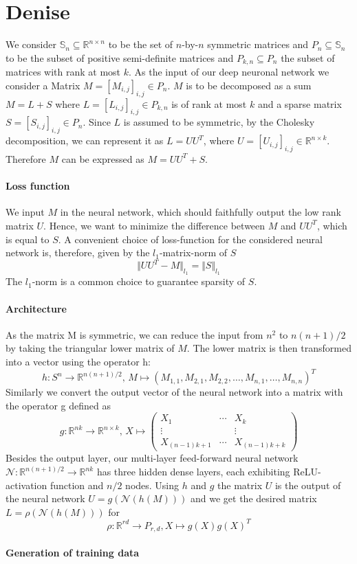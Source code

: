 \section{Denise}\label{sec:algorithm}

We consider $\mathbb{S}_n \subseteq \mathbb{R}^{n \times n}$ to be the set of $n$-by-$n$ symmetric matrices and $P_n\subseteq \mathbb{S}_n$ to be the subset of positive semi-definite matrices and $P_{k,n} \subseteq P_n$ the subset of matrices with rank at most $k$. As the input of our deep neuronal network we consider a Matrix $M = [M_{i,j}]_{i,j} \in P_n$. $M$ is to be decomposed as a sum $M = L + S$ where $L = [L_{i,j}]_{i,j} \in P_{k,n}$ is of rank at most $k$ and a sparse matrix $S = [S_{i,j}]_{i,j} \in P_n$. Since $L$ is assumed to be symmetric, by the Cholesky decomposition, we can represent it as $L=UU^T$, where $U = [U_{i,j}]_{i,j} \in \mathbb{R}^{n \times k}$. Therefore $M$ can be expressed as $M = UU^T + S$.

\paragraph{Loss function}
We input $M$ in the neural network, which should faithfully output the low rank matrix $U$. Hence, we want to minimize the difference between $M$ and $UU^T$, which is equal to $S$. A convenient choice of loss-function for the considered neural network is, therefore, given by the $l_1$-matrix-norm of $S$
\[
\Vert UU^T - M \Vert_{l_1} = \Vert S \Vert_{l_1}
\]
The $l_1$-norm is a common choice to guarantee sparsity of $S$.

\paragraph{Architecture}
As the matrix M is symmetric, we can reduce the input from $n^2$ to $n(n + 1)/2$ by taking the triangular lower matrix of $M$. The lower matrix is then transformed into a vector using the operator h:
\[
h: S^n \to \mathbb{R}^{n(n+1)/2}, \, M \mapsto (M_{1,1},M_{2,1},M_{2,2},\dots,M_{n,1},\dots,M_{n,n})^T
\]
Similarly we convert the output vector of the neural network into a matrix with the operator g defined as
\[
g : \mathbb{R}^{nk} \to \mathbb{R}^{n \times k}, \, X \mapsto \begin{pmatrix} X_1 & \cdots & X_k \\ \vdots & & \vdots \\ X_{(n-1)k + 1} & \cdots& X_{(n-1)k+k}\end{pmatrix}
\]
Besides the output layer, our multi-layer feed-forward neural network $\mathcal{N}: \mathbb{R}^{n(n+1)/2} \to \mathbb{R}^{nk} $ has three hidden dense layers, each exhibiting ReLU-activation function and $n/2$ nodes. Using $h$ and $g$ the matrix $U$ is the output of the neural network $U = g(\mathcal{N}(h(M)))$ and we  get the desired matrix $L=\rho(\mathcal{N}(h(M)))$ for
\[
\rho : \mathbb{R}^{rd} \to P_{r,d}, X \mapsto g(X)g(X)^T
\]


\paragraph{Generation of training data}

